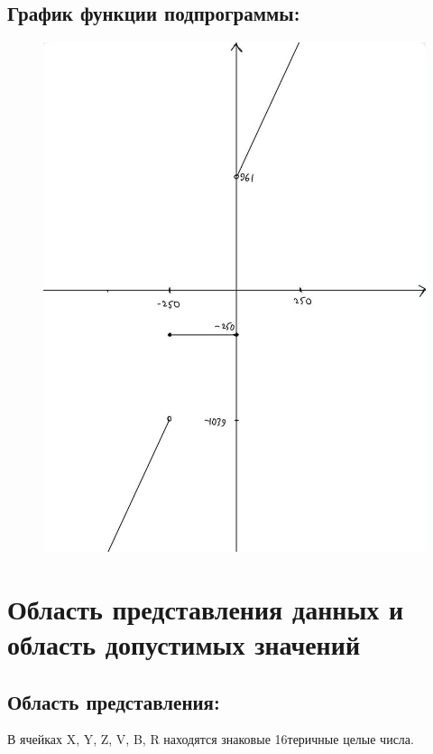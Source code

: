 \subsection{График функции подпрограммы:}
\begin{figure}[H]
    \centering
    \includegraphics[scale=0.3]{img/graphic}
\end{figure}

\newpage


\section{Область представления данных и область допустимых значений}

\subsection{Область представления:}
В ячейках X, Y, Z, V, B, R находятся знаковые 16теричные целые числа.

